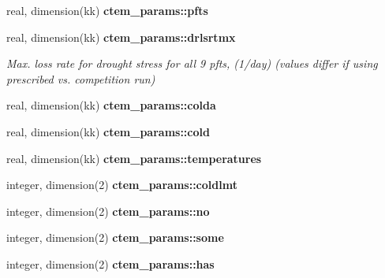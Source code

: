 \begin{DoxyCompactItemize}
\item 
\hypertarget{namespacectem__params_a29e9d3daef16e3db4cca07cc6b9d5360}{}real, dimension(kk) {\bfseries ctem\+\_\+params\+::pfts}\label{namespacectem__params_a29e9d3daef16e3db4cca07cc6b9d5360}

\item 
\hypertarget{namespacectem__params_adcdbf5080dbbe4117e28dad60b76a0d9}{}real, dimension(kk) {\bfseries ctem\+\_\+params\+::drlsrtmx}\label{namespacectem__params_adcdbf5080dbbe4117e28dad60b76a0d9}

\begin{DoxyCompactList}\small\item\em Max. loss rate for drought stress for all 9 pfts, (1/day) (values differ if using prescribed vs. competition run) \end{DoxyCompactList}\item 
\hypertarget{namespacectem__params_a261cdad7b84fcd118ef12b82da029bb7}{}real, dimension(kk) {\bfseries ctem\+\_\+params\+::colda}\label{namespacectem__params_a261cdad7b84fcd118ef12b82da029bb7}

\item 
\hypertarget{namespacectem__params_ab414b42707e648bf82d7c11c21c6a8ed}{}real, dimension(kk) {\bfseries ctem\+\_\+params\+::cold}\label{namespacectem__params_ab414b42707e648bf82d7c11c21c6a8ed}

\item 
\hypertarget{namespacectem__params_a4b9024545f97faf2d4210d966b77fd87}{}real, dimension(kk) {\bfseries ctem\+\_\+params\+::temperatures}\label{namespacectem__params_a4b9024545f97faf2d4210d966b77fd87}

\item 
\hypertarget{namespacectem__params_a3eee73b19e09e9aab077477b6d1d9419}{}integer, dimension(2) {\bfseries ctem\+\_\+params\+::coldlmt}\label{namespacectem__params_a3eee73b19e09e9aab077477b6d1d9419}

\item 
\hypertarget{namespacectem__params_a412c63cebd86cfd065d4b30159776ade}{}integer, dimension(2) {\bfseries ctem\+\_\+params\+::no}\label{namespacectem__params_a412c63cebd86cfd065d4b30159776ade}

\item 
\hypertarget{namespacectem__params_a5343b89d394308d448dd07d881fafade}{}integer, dimension(2) {\bfseries ctem\+\_\+params\+::some}\label{namespacectem__params_a5343b89d394308d448dd07d881fafade}

\item 
\hypertarget{namespacectem__params_ad5355ee894ef7379531169278204c623}{}integer, dimension(2) {\bfseries ctem\+\_\+params\+::has}\label{namespacectem__params_ad5355ee894ef7379531169278204c623}


\end{DoxyCompactItemize}
